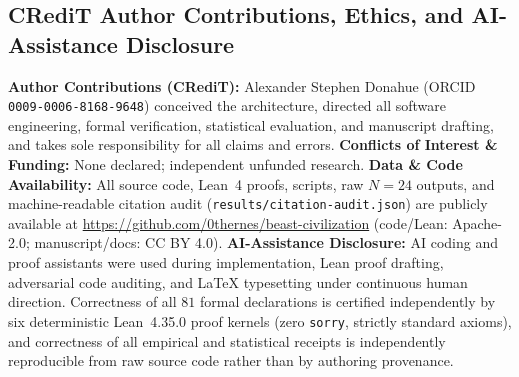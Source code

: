 \documentclass[11pt,letterpaper]{amsart}
\newcommand{\code}[1]{{\small\texttt{#1}}}
\begin{document}
\subsection{CRediT Author Contributions, Ethics, and AI-Assistance Disclosure}
\textbf{Author Contributions (CRediT):} Alexander Stephen Donahue (ORCID
\code{0009-0006-8168-9648}) conceived the architecture, directed all software
engineering, formal verification, statistical evaluation, and manuscript drafting,
and takes sole responsibility for all claims and errors.
\textbf{Conflicts of Interest \& Funding:} None declared; independent unfunded
research.
\textbf{Data \& Code Availability:} All source code, Lean~4 proofs, scripts, raw
$N=24$ outputs, and machine-readable citation audit
(\code{results/citation-audit.json}) are publicly available at
\url{https://github.com/0thernes/beast-civilization} (code/Lean: Apache-2.0;
manuscript/docs: CC BY 4.0).
\textbf{AI-Assistance Disclosure:} AI coding and proof assistants were used during
implementation, Lean proof drafting, adversarial code auditing, and LaTeX
typesetting under continuous human direction. Correctness of all $81$ formal
declarations is certified independently by six deterministic Lean~4.35.0 proof
kernels (zero \code{sorry}, strictly standard axioms), and correctness of all
empirical and statistical receipts is independently reproducible from raw source
code rather than by authoring provenance.



\end{document}
